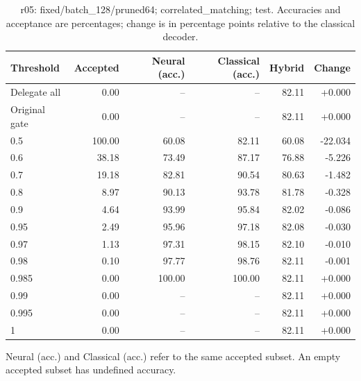 \begin{table}[htbp]
\centering\small
\setlength{\tabcolsep}{3pt}
\caption{r05: fixed/batch\_128/pruned64; correlated\_matching; test. Accuracies and acceptance are percentages; change is in percentage points relative to the classical decoder.}
\begin{tabular}{lrrrrr}
\toprule
Threshold & Accepted & Neural (acc.) & Classical (acc.) & Hybrid & Change \\
\midrule
Delegate all & 0.00 & -- & -- & 82.11 & +0.000 \\
Original gate & 0.00 & -- & -- & 82.11 & +0.000 \\
0.5 & 100.00 & 60.08 & 82.11 & 60.08 & -22.034 \\
0.6 & 38.18 & 73.49 & 87.17 & 76.88 & -5.226 \\
0.7 & 19.18 & 82.81 & 90.54 & 80.63 & -1.482 \\
0.8 & 8.97 & 90.13 & 93.78 & 81.78 & -0.328 \\
0.9 & 4.64 & 93.99 & 95.84 & 82.02 & -0.086 \\
0.95 & 2.49 & 95.96 & 97.18 & 82.08 & -0.030 \\
0.97 & 1.13 & 97.31 & 98.15 & 82.10 & -0.010 \\
0.98 & 0.10 & 97.77 & 98.76 & 82.11 & -0.001 \\
0.985 & 0.00 & 100.00 & 100.00 & 82.11 & +0.000 \\
0.99 & 0.00 & -- & -- & 82.11 & +0.000 \\
0.995 & 0.00 & -- & -- & 82.11 & +0.000 \\
1 & 0.00 & -- & -- & 82.11 & +0.000 \\
\bottomrule
\end{tabular}
\par\smallskip\footnotesize Neural (acc.) and Classical (acc.) refer to the same accepted subset. An empty accepted subset has undefined accuracy.
\end{table}
